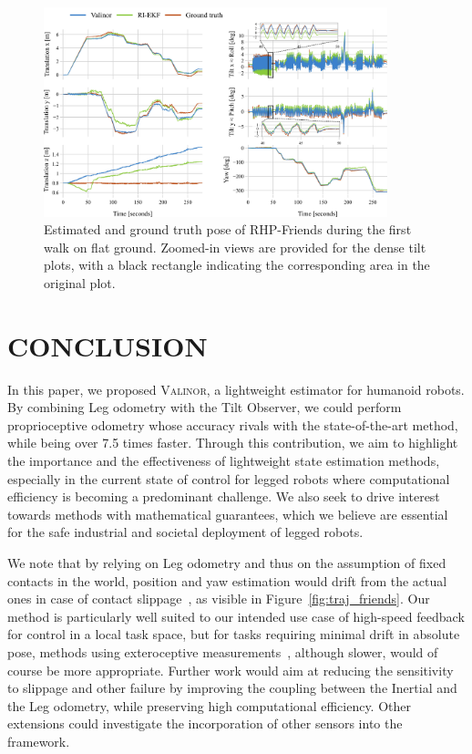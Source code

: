 \documentclass{IJCAS}
\begin{document}
\begin{figure}[!ht]
\begin{center}
\includegraphics[width=0.89\textwidth]{pose.jpg} 
\vskip -0.5pc
\caption{Estimated and ground truth pose of RHP-Friends during the first walk on flat ground. Zoomed-in views are provided for the dense tilt plots, with a black rectangle indicating the corresponding area in the original plot.}\label{fig:pose_rhps1}
\end{center}
\vskip -1.5pc
\end{figure}


\section{CONCLUSION}

In this paper, we proposed {\scshape Valinor}, a lightweight estimator for humanoid robots. By combining Leg odometry with the Tilt Observer, we could perform proprioceptive odometry whose accuracy rivals with the state-of-the-art method, while being over 7.5 times faster. Through this contribution, we aim to highlight the importance and the effectiveness of lightweight state estimation methods, especially in the current state of control for legged robots where computational efficiency is becoming a predominant challenge. We also seek to drive interest towards methods with mathematical guarantees, which we believe are essential for the safe industrial and societal deployment of legged robots. 

We note that by relying on Leg odometry and thus on the assumption of fixed contacts in the world, position and yaw estimation would drift from the actual ones in case of contact slippage~\cite{bloesch2013FusionLegKineAndImu}, as visible in Figure~\ref{fig:traj_friends}. Our method is particularly well suited to our intended use case of high-speed feedback for control in a local task space, but for tasks requiring minimal drift in absolute pose, methods using exteroceptive measurements~\cite{wisth2022vilens, fallon2018AccRobLocWalkRobotsImuVisLidar, Kuang2024TightlyCoupledLidarImuUwb}, although slower, would of course be more appropriate.
Further work would aim at reducing the sensitivity to slippage and other failure by improving the coupling between the Inertial and the Leg odometry, while preserving high computational efficiency. Other extensions could investigate the incorporation of other sensors into the framework.
\end{document}
